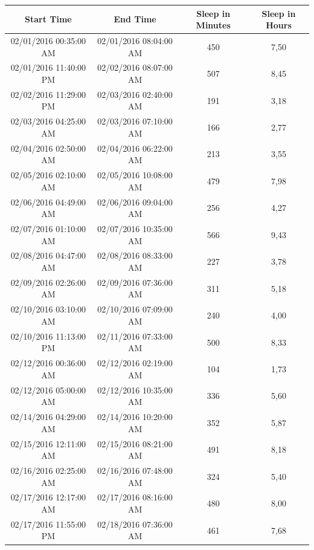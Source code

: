 \documentclass[12pt]{article} %
\begin{document}
\begin{table}[H]
\center
\begin{footnotesize}
	\begin{tabular}{| c | c | c | c |}
	\hline
	\textbf{Start Time} & \textbf{End Time} & \textbf{Sleep in Minutes} & \textbf{Sleep in Hours} \\
	\hline
02/01/2016 00:35:00 AM & 02/01/2016 08:04:00 AM	& 450 & 7,50\\
\hline
02/01/2016 11:40:00	PM & 02/02/2016 08:07:00 AM & 507 & 8,45\\
\hline
02/02/2016 11:29:00	PM & 02/03/2016 02:40:00 AM & 191 & 3,18\\
\hline
02/03/2016 04:25:00	AM & 02/03/2016 07:10:00 AM	& 166 & 2,77\\
\hline
02/04/2016 02:50:00	AM & 02/04/2016 06:22:00 AM	& 213 & 3,55\\
\hline
02/05/2016 02:10:00	AM & 02/05/2016 10:08:00 AM	& 479 & 7,98\\
\hline
\colorbox{blue!20}{02/06/2016 04:49:00 AM} & \colorbox{blue!20}{02/06/2016 09:04:00 AM} & \colorbox{blue!20}{256} & \colorbox{blue!20}{4,27}\\
\hline
\colorbox{blue!30}{02/07/2016 01:10:00 AM} & \colorbox{blue!30}{02/07/2016 10:35:00 AM} & \colorbox{blue!30}{566} & \colorbox{blue!30}{9,43}\\
\hline
02/08/2016 04:47:00	AM & 02/08/2016 08:33:00 AM	& 227 & 3,78\\
\hline
02/09/2016 02:26:00	AM & 02/09/2016 07:36:00 AM	& 311 &	5,18\\
\hline
02/10/2016 03:10:00	AM & 02/10/2016 07:09:00 AM	& 240 &	4,00\\
\hline
02/10/2016 11:13:00	PM & 02/11/2016 07:33:00 AM	& 500 &	8,33\\
\hline
02/12/2016 00:36:00	AM & 02/12/2016 02:19:00 AM	& 104 &	1,73\\
\hline
02/12/2016 05:00:00	AM & 02/12/2016 10:35:00 AM	& 336 &	5,60\\
\hline
\colorbox{blue!30}{02/14/2016 04:29:00 AM} & \colorbox{blue!30}{02/14/2016 10:20:00 AM} & \colorbox{blue!30}{352} & \colorbox{blue!30}{5,87}\\
\hline
02/15/2016 12:11:00 AM & 02/15/2016 08:21:00 AM & 491 &	8,18\\
\hline
02/16/2016 02:25:00 AM & 02/16/2016 07:48:00 AM & 324 &	5,40\\
\hline
02/17/2016 12:17:00 AM & 02/17/2016 08:16:00 AM & 480 &	8,00\\
\hline
02/17/2016 11:55:00 PM & 02/18/2016 07:36:00 AM & 461 &	7,68\\

\end{tabular}
\end{footnotesize}
\end{table}
\end{document}
